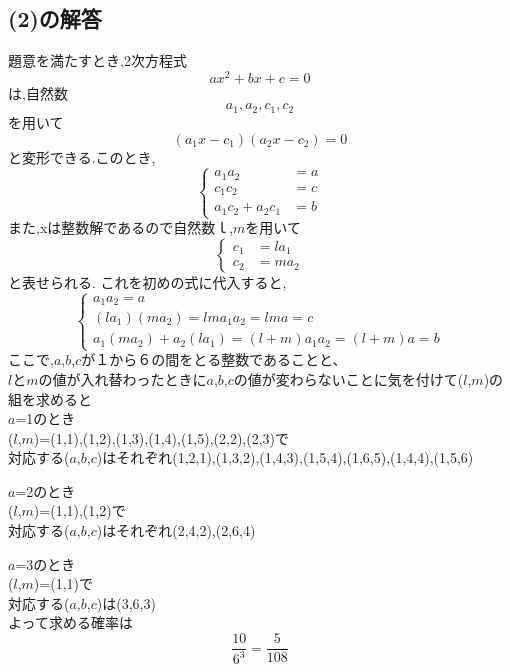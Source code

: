 \documentclass{jarticle}
\begin{document}
\subsection*{(2)の解答}
題意を満たすとき,2次方程式
\[
a x^2+bx+c = 0 
\]
は,自然数
\[a_1,a_2,c_1,c_2
\]を用いて
\[
(a_1 x-c_1)(a_2 x-c_2)=0
\]
と変形できる.このとき,
\[
\begin{cases}
a_1 a_2&=a \\
c_1 c_2&=c \\
a_1 c_2+a_2 c_1&=b
\end{cases}
\]
また,xは整数解であるので自然数$ｌ$,$m$を用いて
\[
\begin{cases}
c_1&=l a_1\\
c_2&=m a_2
\end{cases}
\]
と表せられる.
これを初めの式に代入すると,
\[
\begin{cases}
a_1 a_2=a\\
(la_1)(ma_2)=lma_1a_2=lma=c\\
a_1(ma_2)+a_2(la_1)=(l+m)a_1a_2=(l+m)a=b
\end{cases}
\]
ここで,$a$,$b$,$c$が１から６の間をとる整数であることと、\\
$l$と$m$の値が入れ替わったときに$a$,$b$,$c$の値が変わらないことに気を付けて($l$,$m$)の組を求めると\\

$a$=1のとき\\
($l$,$m$)=(1,1),(1,2),(1,3),(1,4),(1,5),(2,2),(2,3)で\\
対応する($a$,$b$,$c$)はそれぞれ(1,2,1),(1,3,2),(1,4,3),(1,5,4),(1,6,5),(1,4,4),(1,5,6)

$a$=2のとき\\
($l$,$m$)=(1,1),(1,2)で\\
対応する($a$,$b$,$c$)はそれぞれ(2,4,2),(2,6,4)

$a$=3のとき\\
($l$,$m$)=(1,1)で\\
対応する($a$,$b$,$c$)は(3,6,3)\\

よって求める確率は
\[
\frac{10}{6^3}=\frac{5}{108}
\]
\end{document}
